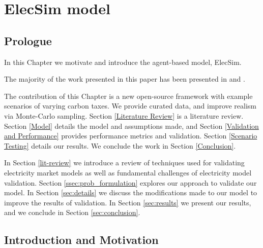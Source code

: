 \chapter{ElecSim model}
\label{chapter:elecsim}

\ifpdf
    \graphicspath{{Chapter3/Figs/Raster/}{Chapter3/Figs/PDF/}{Chapter3/Figs/}}
\else
    \graphicspath{{Chapter3/Figs/Vector/}{Chapter3/Figs/}}
\fi

\section*{Prologue}

In this Chapter we motivate and introduce the agent-based model, ElecSim. 

The majority of the work presented in this paper has been presented in \cite{Kell} and \cite{Kell2020}.


The contribution of this Chapter is a new open-source framework with example scenarios of varying carbon taxes. We provide curated data, and improve realism via Monte-Carlo sampling. Section \ref{Literature Review} is a literature review. Section \ref{Model} details the model and assumptions made, and Section \ref{Validation and Performance} provides performance metrics and validation. Section \ref{Scenario Testing} details our results. We conclude the work in Section \ref{Conclusion}.




In Section \ref{lit-review} we introduce a review of techniques used for validating electricity market models as well as fundamental challenges of electricity model validation. Section \ref{ssec:prob_formulation} explores our approach to validate our model. In Section \ref{sec:details} we discuss the modifications made to our model to improve the results of validation. In Section \ref{sec:results} we present our results, and we conclude in Section \ref{sec:conclusion}.


\section{Introduction and Motivation}

